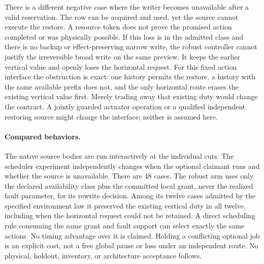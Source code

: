 \documentclass{article}
\begin{document}
There is a different negative case where the writer becomes
unavailable after a valid reservation. The row can be acquired and
used, yet the source cannot execute the restore. A resource token
does not prove the promised action completed or was physically
possible. If this loss is in the admitted class and there is no
backup or effect-preserving narrow write, the robust controller
cannot justify the irreversible broad write on the same preview.
It keeps the earlier vertical value and openly loses the horizontal
request. For this fixed action interface the obstruction is exact:
one history permits the restore, a history with the same available
prefix does not, and the only horizontal route erases the existing
vertical value first. Merely trading away that existing duty would
change the contract. A jointly guarded actuator operation or a
qualified independent restoring source might change the interface;
neither is assumed here.

\paragraph{Compared behaviors.}
The native source bodies are run interactively at the individual
cuts. The scheduler experiment independently changes when the
optional claimant runs and whether the source is unavailable.
There are 48 cases. The robust arm uses only the declared
availability class plus the committed local grant, never the
realized fault parameter, for its rewrite decision. Among its twelve
cases admitted by the specified environment law it preserved the
existing vertical duty in all twelve, including when the horizontal
request could not be retained. A direct scheduling rule consuming
the same grant and fault support can select exactly the same actions.
No timing advantage over it is claimed. Holding a conflicting
optional job is an explicit cost, not a free global pause or loss
under an independent route. No physical, holdout, inventory, or
architecture acceptance follows.
\end{document}
